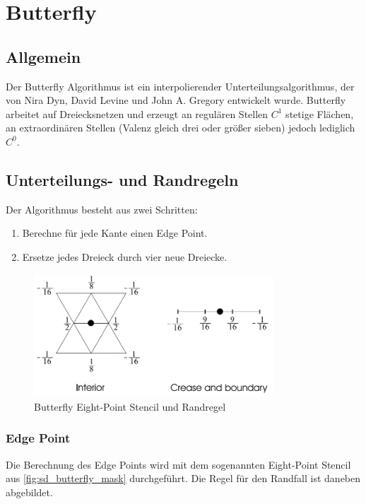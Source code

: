 \section{Butterfly} \label{sec:butterfly}

\subsection{Allgemein}

Der Butterfly Algorithmus ist ein interpolierender Unterteilungsalgorithmus,
der von Nira Dyn, David Levine und John A. Gregory entwickelt wurde.
Butterfly arbeitet auf Dreiecksnetzen und erzeugt an regulären Stellen
\(C^1\) stetige Flächen, an extraordinären Stellen
(Valenz gleich drei oder größer sieben) jedoch lediglich \(C^0\).
\cite[S. 64ff]{Standford.24.07.2015} \cite[S. 72ff]{Zorin.subdivcourse}
\cite{Seeger01asub-atomic}
\cite{Gamasutra}
\cite{Sharp}
\cite{Zorin:1996:ISM:237170.237254}

\subsection{Unterteilungs- und Randregeln}

Der Algorithmus besteht aus zwei Schritten:
\begin{enumerate}
\item Berechne für jede Kante einen Edge Point.
\item Ersetze jedes Dreieck durch vier neue Dreiecke.
\end{enumerate}

\begin{figure}
\centering
\includegraphics[width=0.8\textwidth]{content/media/sd_butterfly_mask.jpg}
\caption{Butterfly Eight-Point Stencil und Randregel \cite{Seeger01asub-atomic}}
\label{fig:sd_butterfly_mask}
\end{figure}

\subsubsection*{Edge Point}
Die Berechnung des Edge Points wird mit dem sogenannten Eight-Point Stencil
aus \autoref{fig:sd_butterfly_mask} durchgeführt.
Die Regel für den Randfall ist daneben abgebildet.


